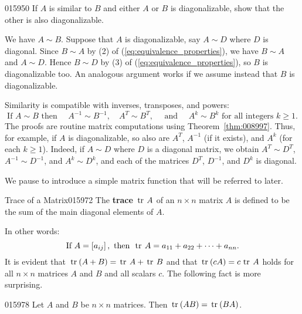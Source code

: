 \begin{example}{}{015950}
If $A$ is similar to $B$ and either $A$ or $B$ is diagonalizable, show that the other is also diagonalizable.

\begin{solution}
We have $A \sim B$. Suppose that $A$ is diagonalizable, say $A \sim D$ where $D$ is diagonal. Since $B \sim A$ by (2) of (\ref{eq:equivalence_properties}), we have $B \sim A$ and $A \sim D$. Hence $B \sim D$ by (3) of (\ref{eq:equivalence_properties}), so $B$ is diagonalizable too. An analogous argument works if we assume instead that $B$ is diagonalizable.
\end{solution}
\end{example}

Similarity is compatible with inverses, transposes, and powers:
\begin{equation*}
\mbox{If } A \sim B\mbox{ then } \quad  A^{-1} \sim B^{-1}, \quad A^T \sim B^T,\quad \mbox{ and } \quad A^k \sim B^k\mbox{ for all integers } k \geq 1.
\end{equation*}
The proofs are routine matrix computations using Theorem~\ref{thm:008997}. Thus, for example, if $A$ is diagonalizable, so also are $A^{T}$, $A^{-1}$ (if it exists), and $A^{k}$ (for each $k \geq 1$). Indeed, if $A \sim D$ where $D$ is a diagonal matrix, we obtain $A^{T} \sim D^{T}$, $A^{-1} \sim D^{-1}$, and $A^{k} \sim D^{k}$, and each of the matrices $D^{T}$, $D^{-1}$, and $D^{k}$ is diagonal.

We pause to introduce a simple matrix function that will be referred to later.

\begin{definition}{Trace of a Matrix}{015972} %
The \textbf{trace} $\thinspace\operatorname{tr\medspace} A$ of an $n \times n$ matrix $A$ is defined to be the sum of the main diagonal elements of $A$.
\end{definition}

\noindent In other words:
\begin{equation*}
\mbox{If } A = \left[ a_{ij}\right],\mbox{ then } \thinspace\operatorname{tr \medspace} A = a_{11} + a_{22} + \dots + a_{nn}.
\end{equation*}
It is evident that $\thinspace\operatorname{tr\medspace}(A + B) = \thinspace\operatorname{tr\medspace} A + \thinspace\operatorname{tr\medspace} B$ and that $\thinspace\operatorname{tr\medspace}(cA) = c \thinspace\operatorname{tr\medspace} A$ holds for all $n \times n$ matrices $A$ and $B$ and all scalars $c$. The following fact is more surprising.

\begin{lemma}{}{015978}
Let $A$ and $B$ be $n \times n$ matrices. Then $\thinspace\operatorname{tr\medspace}(AB) = \thinspace\operatorname{tr\medspace}(BA)$.
\end{lemma}

